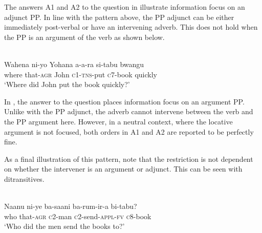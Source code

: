 \documentclass[output=paper]{langsci/langscibook}
\begin{document}
The answers A1 and A2 to the question in  illustrate information focus on an adjunct PP. In line with the pattern above, the PP adjunct can be either immediately post-verbal or have an intervening adverb. This does not hold when the PP is an argument of the verb as shown below.  


\ea\label{ex:safir:16} 
\settowidth{}
\\
\gll Wahena  ni-yo    Yohana   a-a-ra     si-tabu          bwangu \\
      where     that-\textsc{agr}   John     \textsc{c1-tns}-put   \textsc{c}7-book       quickly\\
\glt ‘Where did John put the book quickly?’  
\z
\z


In , the answer to the question places information focus on an argument PP. Unlike with the PP adjunct, the adverb cannot intervene between the verb and the PP argument here. However, in a neutral context, where the locative argument is not focused, both orders in A1 and A2 are reported to be perfectly fine.

As a final illustration of this pattern, note that the restriction is not dependent on whether the intervener is an argument or adjunct. This can be seen with ditransitives. 


\ea\label{ex:safir:17} 
\settowidth{}
\\
\gll   Naanu    ni-ye    ba-saani   ba-rum-ir-a     bi-tabu?\\
     who     that-\textsc{agr}   \textsc{c}2-man   \textsc{c}2-send-\textsc{appl-fv}   \textsc{c}8-book\\
\glt ‘Who did the men send the books to?’
\z
\z
\end{document}
